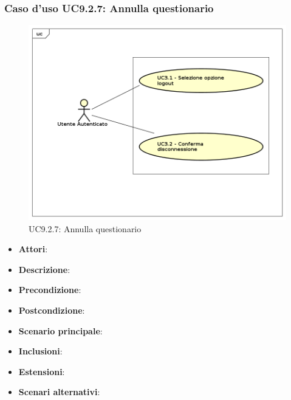 		\subsubsection{Caso d'uso UC9.2.7: Annulla questionario}
		\label{UC9.2.7}
		\begin{figure}[h]
			\centering
		\includegraphics[scale=0.7,keepaspectratio]{UML/UC9.png}
			\caption{UC9.2.7: Annulla questionario}
		\end{figure}
		\FloatBarrier
		\begin{itemize}
			\item \textbf{Attori}: 
			\item \textbf{Descrizione}: 
			\item \textbf{Precondizione}: 
			\item \textbf{Postcondizione}: 
			\item \textbf{Scenario principale}:
			\item \textbf{Inclusioni}:
			\item \textbf{Estensioni}:
			\item \textbf{Scenari alternativi}:
		\end{itemize}

		